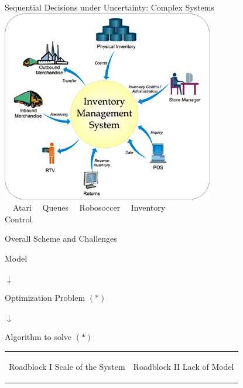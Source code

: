 \documentclass[10pt]{beamer}
\begin{document}
\begin{frame}[fragile]{Sequential Decisions under Uncertainty: Complex Systems}
$\mbox{ }$$\mbox{ }$
\includegraphics[scale=0.125]{invent.jpeg}
$\mbox{ }$\\
$\mbox{ }$
\quad Atari\quad\quad\quad\quad
$\mbox{ }$
Queues\quad\quad\quad\quad
$\mbox{ }$
 Robosoccer\quad\quad
$\mbox{ }$
Inventory
$\mbox{ }$\\
\quad\quad\quad\quad\quad\quad\quad
\quad\quad\quad\quad\quad\quad\quad
\quad\quad\quad\quad\quad\quad\quad
\quad\quad\quad
Control

\end{frame}

\begin{frame}[fragile]{Overall Scheme and Challenges}

\begin{block}{}
\centering    Model
\end{block}
\centering $\downarrow$
\begin{block}{}
\centering Optimization Problem $(*)$
\end{block}
\centering $\downarrow$
\begin{block}{}
\centering Algorithm to solve $(*)$
\end{block}
\begin{table}
\begin{tabular}{lr}
\begin{minipage}{0.5\textwidth}
\begin{center}
\begin{block}{\centering Roadblock I}
\centering Scale of the System
\end{block}
\end{center}
{\color{orange}{Approximate Algorithms} }
\end{minipage}
&
\begin{minipage}{0.5\textwidth}
\begin{center}
\begin{block}{\centering Roadblock II}
\centering Lack of Model
\end{block}
\end{center}
{\color{orange}{Stochastic Algorithms}}
\end{minipage}


\end{tabular}
\end{table}

\end{frame}
\end{document}
